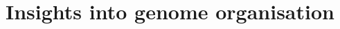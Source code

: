 \documentclass[a4paper,11pt,oneside]{book}
\begin{document}
%
%



\section{Insights into genome organisation}

\end{document}
